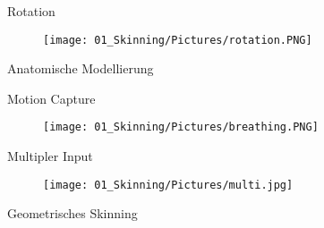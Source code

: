 {
	
	\begin{frame}{\Huge{Rotation}}
		
		\begin{figure}
			\texttt{[image: 01\_Skinning/Pictures/rotation.PNG]}
		\end{figure}
		
		
		
	\end{frame}
}

{ %
	\begin{frame}{\Huge{Anatomische Modellierung}}
		
		
		
		
	\end{frame}
} %

{
	
	\begin{frame}{\Huge{Motion Capture}}
		
		\begin{figure}
			\texttt{[image: 01\_Skinning/Pictures/breathing.PNG]}
		\end{figure}
		
		
		
	\end{frame}
}

	\begin{frame}{\Huge{Multipler Input}}

		
		\begin{figure}
			\texttt{[image: 01\_Skinning/Pictures/multi.jpg]}
		\end{figure}
		
		
		
	\end{frame}


{ %
	\begin{frame}{\colorbox{black!10}{\Huge{Geometrisches Skinning}}}
		
		
		
		
	\end{frame}
} %

